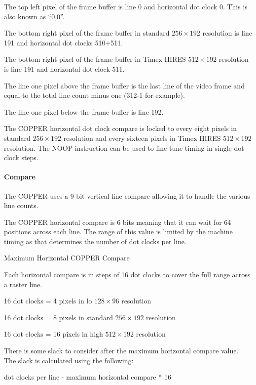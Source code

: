 The top left pixel of the frame buffer is line 0 and horizontal dot
clock 0. This is also known as ``0,0''.

The bottom right pixel of the frame buffer in standard $256\times192$
resolution is line 191 and horizontal dot clocks 510+511.

The bottom right pixel of the frame buffer in Timex HIRES
$512\times192$ resolution is line 191 and horizontal dot clock 511.

The line one pixel above the frame buffer is the last line of the
video frame and equal to the total line count minus one (312-1 for
example).

The line one pixel below the frame buffer is line 192.

The COPPER horizontal dot clock compare is locked to every eight
pixels in standard $256\times192$ resolution and every sixteen pixels
in Timex HIRES $512\times192$ resolution. The NOOP instruction can be
used to fine tune timing in single dot clock steps.

\paragraph{Compare}

The COPPER uses a 9 bit vertical line compare allowing it to handle
the various line counts.

The COPPER horizontal compare is 6 bits meaning that it can wait for
64 positions across each line. The range of this value is limited by
the machine timing as that determines the number of dot clocks per
line.

\begin{table}[ht]\centering
  \caption{Maximum Horizontal COPPER Compare}
\end{table}

Each horizontal compare is in steps of 16 dot clocks to cover the full
range across a raster line.

16 dot clocks = 4 pixels in lo $128\times96$ resolution

16 dot clocks = 8 pixels in standard $256\times192$ resolution

16 dot clocks = 16 pixels in high $512\times192$ resolution

There is some slack to consider after the maximum horizontal compare
value. The slack is calculated using the following:

dot clocks per line - maximum horizontal compare * 16
          

